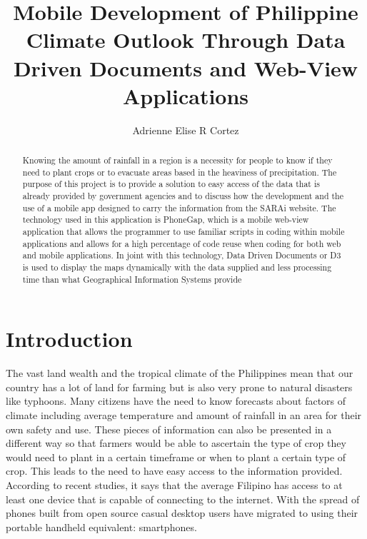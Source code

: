\documentclass[letterpaper, 10 pt, conference]{ieeeconf}  %
\title{\LARGE \bf
Mobile Development of Philippine Climate Outlook Through Data Driven Documents and Web-View Applications
}
\author{Adrienne Elise R Cortez}
\begin{document}
\maketitle
\thispagestyle{empty}
\pagestyle{empty}


\begin{abstract}

Knowing the amount of rainfall in a region is a necessity for people
to know if they need to plant crops or to evacuate areas based in the
heaviness of precipitation. The purpose of this project is to provide a
solution to easy access of the data that is already provided by
government agencies and to discuss how the development and the use of
a mobile app designed to carry the information from the SARAi website.
The technology used in this application is PhoneGap, which is a mobile
web-view application that allows the programmer to use familiar scripts
in coding within mobile applications and allows for a high percentage of
code reuse when coding for both web and mobile applications. In joint
with this technology, Data Driven Documents or D3 is used to display the
maps dynamically with the data supplied and less processing time than
what Geographical Information Systems provide

\end{abstract}


\section{Introduction}

The vast land wealth and the tropical climate of the Philippines mean that our country has a lot of land for farming but is also very prone to natural disasters like typhoons. Many citizens have the need to know forecasts about factors of climate including average temperature and amount of rainfall in an area for their own safety and use. These pieces of information can also be presented in a different way so that farmers would be able to ascertain the type of crop they would need to plant in a certain timeframe or when to plant a certain type of crop. This leads to the need to have easy access to the information provided. According to recent studies, it says that the average Filipino has access to at least one device that is capable of connecting to the internet. With the spread of phones built from open source casual desktop users have migrated to using their portable handheld equivalent: smartphones. \setlength{\parskip}{6pt}
\end{document}
